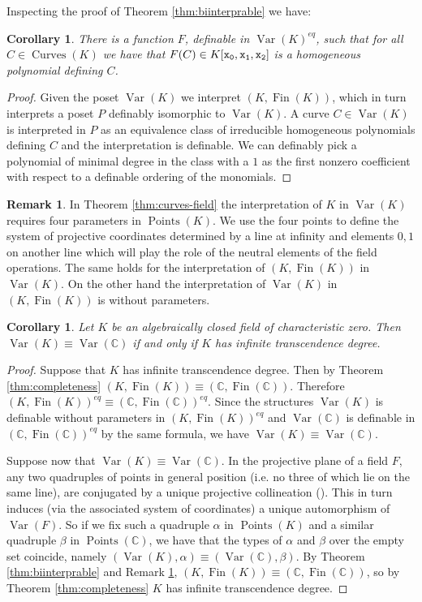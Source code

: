 \documentclass{amsart}
\newcommand{\C}{\mathbb C}
\newcommand{\Fin}{\operatorname{Fin}}
\theoremstyle{plain}
\newtheorem{cor}[thm]{Corollary}
\theoremstyle{definition}
\newtheorem{rem}[thm]{Remark}
\newcommand{\Var}[1]{\operatorname{Var}(#1)}
\newcommand{\Points}[1]{\operatorname{Points} (#1)}
\newcommand{\Curves}[1]{\operatorname{Curves}(#1)}
\begin{document}
Inspecting the proof of Theorem \ref{thm:biinterprable} we have: 

\begin{cor}\label{cor:recover-equation}
	There is a function $F$, definable in $\Var{K}^{eq}$, such that for all $C \in \Curves{K}$ we have that $F(C)\in K[\tt x_0, \tt x_1, \tt x_2]$ is a homogeneous polynomial defining $C$.
\end{cor}	
\begin{proof}
Given the poset $\Var K$ we interpret $(K, \Fin(K))$, which in turn interprets a poset $P$ definably isomorphic to $\Var K$. A curve $C\in \Var K$ is interpreted in $P$ as an equivalence class of irreducible homogeneous polynomials defining $C$ and the interpretation is definable. We can definably pick a polynomial of minimal degree in the class with a $1$ as the first nonzero coefficient with respect to a definable ordering of the monomials.  
\end{proof}

\begin{rem}\label{rem:four points}
	In Theorem \ref{thm:curves-field} the interpretation of $K$ in $\Var K$ requires four parameters in $\Points K$. 
	We use the four points to define the system of projective coordinates determined by a line at infinity and elements $0,1$ on another line which will play the role of the neutral elements of the field operations.  The same holds for the interpretation of $(K, \Fin(K))$ in $\Var K$. On the other hand the interpretation of $\Var K$ in $(K, \Fin(K))$ is without parameters. 
\end{rem}

\begin{cor}\label{cor:var}
	Let $K$ be an algebraically closed field of characteristic zero. Then 
	 $\Var K \equiv \Var \C$ if and only if $K$ has infinite transcendence degree. 
\end{cor}
\begin{proof}
	Suppose that $K$ has infinite transcendence degree. Then by Theorem \ref{thm:completeness} $(K, \Fin(K)) \equiv (\C, \Fin(\C))$. Therefore $(K, \Fin(K))^{eq} \equiv (\C, \Fin(\C))^{eq}$. Since the structures $\Var K$ is definable without parameters in $(K, \Fin(K))^{eq}$ and $\Var \C$ is definable in $(\C, \Fin(\C))^{eq}$ by the same formula, we have $\Var K \equiv \Var \C$. 
	
	Suppose now that $\Var K \equiv \Var \C$. In the projective plane of a field $F$, any two quadruples of points in general position (i.e. no three of which lie on the same line), are conjugated by a unique projective collineation (\cite[Theorem 8.12]{Har}). This in turn induces (via the associated system of coordinates) a unique automorphism of $\Var F$. So if we fix such a quadruple $\alpha$ in $\Points K$ and a similar quadruple $\beta$ in $\Points \C$, we have that the types of $\alpha$ and $\beta$ over the empty set coincide, namely $(\Var K, \alpha) \equiv (\Var \C, \beta)$. By Theorem \ref{thm:biinterprable} and Remark \ref{rem:four points}, $(K, \Fin (K)) \equiv (\C, \Fin(\C))$, so by Theorem \ref{thm:completeness} $K$ has infinite transcendence degree.  
\end{proof}
		
\end{document}
